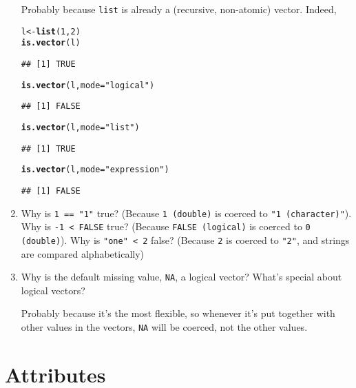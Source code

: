\documentclass{article}\usepackage[]{graphicx}\usepackage[]{color}
\makeatletter
\newcommand{\hlnum}[1]{\textcolor[rgb]{0.686,0.059,0.569}{#1}}%
\newcommand{\hlstr}[1]{\textcolor[rgb]{0.192,0.494,0.8}{#1}}%
\newcommand{\hlstd}[1]{\textcolor[rgb]{0.345,0.345,0.345}{#1}}%
\newcommand{\hlkwb}[1]{\textcolor[rgb]{0.69,0.353,0.396}{#1}}%
\newcommand{\hlkwc}[1]{\textcolor[rgb]{0.333,0.667,0.333}{#1}}%
\newcommand{\hlkwd}[1]{\textcolor[rgb]{0.737,0.353,0.396}{\textbf{#1}}}%
\newenvironment{kframe}{%
 \def\at@end@of@kframe{}%
 \ifinner\ifhmode%
  \def\at@end@of@kframe{\end{minipage}}%
  \begin{minipage}{\columnwidth}%
 \fi\fi%
 \def\FrameCommand##1{\hskip\@totalleftmargin \hskip-\fboxsep
 \colorbox{shadecolor}{##1}\hskip-\fboxsep
     \hskip-\linewidth \hskip-\@totalleftmargin \hskip\columnwidth}%
 \MakeFramed {\advance\hsize-\width
   \@totalleftmargin\z@ \linewidth\hsize
   \@setminipage}}%
 {\par\unskip\endMakeFramed%
 \at@end@of@kframe}
\newenvironment{knitrout}{}{} %
\makeatother
\begin{document}
\begin{enumerate}
Probably because \verb`list` is already a (recursive, non-atomic) vector. Indeed,

\begin{knitrout}
\color{fgcolor}\begin{kframe}
\begin{alltt}
\hlstd{l} \hlkwb{<-} \hlkwd{list}\hlstd{(}\hlnum{1}\hlstd{,} \hlnum{2}\hlstd{)}
\hlkwd{is.vector}\hlstd{(l)}
\end{alltt}
\begin{verbatim}
## [1] TRUE
\end{verbatim}
\begin{alltt}
\hlkwd{is.vector}\hlstd{(l,} \hlkwc{mode}\hlstd{=}\hlstr{"logical"}\hlstd{)}
\end{alltt}
\begin{verbatim}
## [1] FALSE
\end{verbatim}
\begin{alltt}
\hlkwd{is.vector}\hlstd{(l,} \hlkwc{mode}\hlstd{=}\hlstr{"list"}\hlstd{)}
\end{alltt}
\begin{verbatim}
## [1] TRUE
\end{verbatim}
\begin{alltt}
\hlkwd{is.vector}\hlstd{(l,} \hlkwc{mode}\hlstd{=}\hlstr{"expression"}\hlstd{)}
\end{alltt}
\begin{verbatim}
## [1] FALSE
\end{verbatim}
\end{kframe}
\end{knitrout}

\item Why is \verb`1 == "1"` true? (Because \verb`1 (double)` is coerced to \verb`"1 (character)"`). Why is \verb`-1 < FALSE` true? (Because \verb`FALSE (logical)` is coerced to \verb`0 (double)`). Why is \verb`"one" < 2` false? (Because \verb`2` is coerced to \verb`"2"`, and strings are compared alphabetically)

\item Why is the default missing value, \verb`NA`, a logical vector? What's special about logical vectors?

Probably because it's the most flexible, so whenever it's put together with other values in the vectors, \verb`NA` will be coerced, not the other values.

\end{enumerate}

\section{Attributes}
\end{document}
